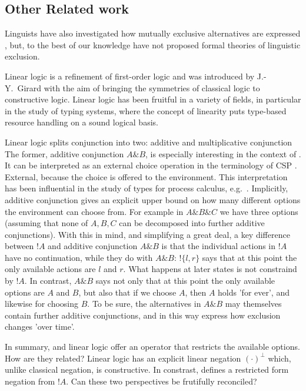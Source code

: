 \subsection{Other Related work}

Linguists have also investigated how mutually exclusive alternatives
are expressed \cite{OKeeffeA:rouhanocl}, but, to the best of our knowledge have not
proposed formal theories of linguistic exclusion.

Linear logic \cite{GirardJY:linlog,GirardJY:protyp} is a refinement of
first-order logic and was introduced by J.-Y.~Girard with the aim of
bringing the symmetries of classical logic to constructive
logic. Linear logic has been fruitful in a variety of fields, in
particular in the study of typing systems, where the concept of
linearity puts type-based resource handling on a sound logical basis.

Linear logic splits conjunction into two: additive and multiplicative
conjunction The former, additive conjunction $A \& B$, is especially
interesting in the context of \ELFULL{}. It can be interpreted
\cite{AbramskyS:comintoll} as an external choice operation in the
terminology of CSP \cite{HoareC:comseq}. External, because the choice
is offered to the environment.  This interpretation has been
influential in the study of types for process calculus,
e.g.~\cite{HondaK:unitypsfsifLONG,TakeuchiK:intbaslaits,HondaK:lanpriatdfscbp}.
Implicitly, additive conjunction gives an explicit upper bound on how
many different options the environment can choose from. For example in
$A \& B \& C$ we have three options (assuming that none of $A, B, C$
can be decomposed into further additive conjunctions).  With this in
mind, and simplifying a great deal, a key difference between $!A$ and
additive conjunction $A \& B$ is that the individual actions in $!A$
have no continuation, while they do with $A \& B$: $!\{l, r\}$ says
that at this point the only available actions are $l$ and $r$. What
happens at later states is not constraind by $!A$.  In contrast, $A \&
B$ says not only that at this point the only available options are $A$
and $B$, but also that if we choose $A$, then $A$ holds 'for ever',
and likewise for choosing $B$. To be sure, the alternatives in $A \&
B$ may themselves contain further additive conjunctions, and in this
way express how exclusion changes 'over time'.

In summary, \ELABR{} and linear logic offer an operator that restricts
the available options. How are they related? Linear logic has an
explicit linear negation $(\cdot)^{\bot}$ which, unlike classical
negation, is constructive. In constrast, \ELABR{} defines a restricted
form negation from $!A$. Can these two perspectives be frutifully
reconciled?

